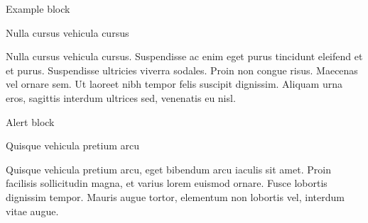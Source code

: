 \documentclass{beamer}
\begin{document}
\begin{frame}{Example block}
  \begin{exampleblock}{Nulla cursus vehicula cursus}


    Nulla cursus vehicula cursus. Suspendisse ac enim eget purus 
    tincidunt eleifend et et purus. Suspendisse ultricies viverra 
    sodales. Proin non congue risus. Maecenas vel ornare sem. Ut 
    laoreet nibh tempor felis suscipit dignissim. Aliquam urna 
    eros, sagittis interdum ultrices sed, venenatis eu nisl.

  \end{exampleblock}
\end{frame}

\begin{frame}{Alert block}
  \begin{alertblock}{Quisque vehicula pretium arcu}

    Quisque vehicula pretium arcu, eget bibendum arcu iaculis sit amet. 
    Proin facilisis sollicitudin magna, et varius lorem euismod ornare. 
    Fusce lobortis dignissim tempor. Mauris augue tortor, elementum non 
    lobortis vel, interdum vitae augue.

  \end{alertblock}
\end{frame}
\end{document}

